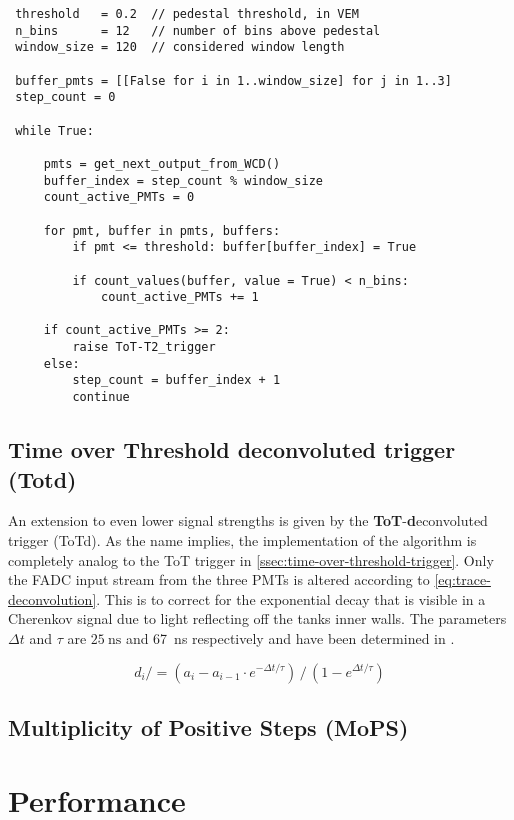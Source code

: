 \begin{lstlisting}
 threshold   = 0.2  // pedestal threshold, in VEM
 n_bins      = 12   // number of bins above pedestal
 window_size = 120  // considered window length

 buffer_pmts = [[False for i in 1..window_size] for j in 1..3] 
 step_count = 0

 while True:

     pmts = get_next_output_from_WCD()
     buffer_index = step_count % window_size
     count_active_PMTs = 0

     for pmt, buffer in pmts, buffers:
         if pmt <= threshold: buffer[buffer_index] = True

         if count_values(buffer, value = True) < n_bins:
             count_active_PMTs += 1

     if count_active_PMTs >= 2:
         raise ToT-T2_trigger
     else:
         step_count = buffer_index + 1
         continue
\end{lstlisting}
    

\subsection{Time over Threshold deconvoluted trigger (Totd)}
\label{ssec:time-over-threshold-deconvoluted}

An extension to even lower signal strengths is given by the \textbf{ToT}-\textbf{d}econvoluted trigger (ToTd). As the name implies, the implementation of the 
algorithm is completely analog to the ToT trigger in \autoref{ssec:time-over-threshold-trigger}. Only the FADC input stream from the three PMTs is altered 
according to \autoref{eq:trace-deconvolution}. This is to correct for the exponential decay that is visible in a Cherenkov signal due to light reflecting off 
the tanks inner walls. The parameters $\Delta t$ and $\tau$ are $\SI{25}{\nano\second}$ and \SI{67}{\nano\second} respectively and have been determined in
\cite{ToTtriggerSetting}.

\begin{equation}
    \label{eq:trace-deconvolution}
    d_i /= (a_i - a_{i-1}\cdot e^{-\Delta t/\tau})\,/\,(1 - e^{\Delta t/\tau}) 
\end{equation}

\subsection{Multiplicity of Positive Steps (MoPS)}
\label{ssec:multiplicity-of-positive-steps}



\section{Performance}
\label{sec:classical-triggers-performance}




